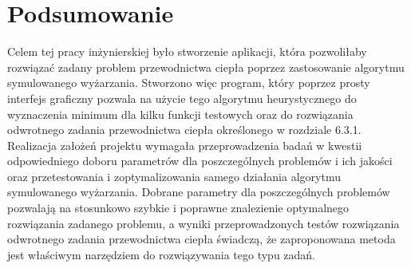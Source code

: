 \documentclass[twoside]{projektInzynierskiMS1}
\newcommand{\si}{ś}
\begin{document}
\section{Podsumowanie}
Celem tej pracy inżynierskiej było stworzenie aplikacji, która pozwoliłaby rozwiązać zadany problem przewodnictwa ciepła poprzez zastosowanie algorytmu symulowanego wyżarzania. Stworzono więc program, który poprzez prosty interfejs graficzny pozwala na użycie tego algorytmu heurystycznego do wyznaczenia minimum dla kilku funkcji testowych oraz do rozwiązania odwrotnego zadania przewodnictwa ciepła okre\si lonego w rozdziale 6.3.1. \\

Realizacja założeń projektu wymagała przeprowadzenia badań w kwestii odpowiedniego doboru parametrów dla poszczególnych problemów i ich jako\si ci oraz przetestowania i zoptymalizowania samego działania algorytmu symulowanego wyżarzania. Dobrane parametry dla poszczególnych problemów pozwalają na stosunkowo szybkie i poprawne znalezienie optymalnego rozwiązania zadanego problemu, a wyniki przeprowadzonych testów rozwiązania odwrotnego zadania przewodnictwa ciepła \si wiadczą, że zaproponowana metoda jest wła\si ciwym narzędziem do rozwiązywania tego typu zadań. \\
\end{document}
